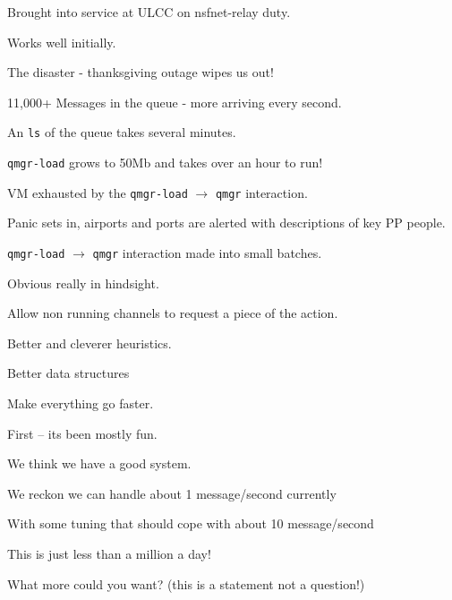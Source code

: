 \begin{bwslide}
\begin{nrtc}
\item	Brought into service at ULCC on nsfnet-relay duty.
\item	Works well initially.
\item	The disaster - thanksgiving outage wipes us out!
\item	11,000+ Messages in the queue - more arriving every second.
\item	An \verb|ls| of the queue takes several minutes.
\item	\verb|qmgr-load| grows to 50Mb and takes over an hour to run!
\item	VM exhausted by the \verb|qmgr-load| $\rightarrow$
	 \verb|qmgr| interaction.
\item	Panic sets in, airports and ports are alerted with
descriptions of key PP people.
\end{nrtc}
\end{bwslide}

\begin{bwslide}
\begin{nrtc}
\item	\verb|qmgr-load| $\rightarrow$ \verb|qmgr| interaction made
	into small batches.
\item	Obvious really in hindsight.
\item	Allow non running channels to request a piece of the action.
\item	Better and cleverer heuristics.
\item	Better data structures
\item	Make everything go faster.
\end{nrtc}
\end{bwslide}

\begin{bwslide}

\begin{nrtc}
\item	First -- its been mostly fun.
\item	We think we have a good system.
\item	We reckon we can handle about 1 message/second currently
\item	With some tuning that should cope with about 10 message/second
\item	This is just less than a million a day!
\item	What more could you want? (this is a statement not a question!)
\end{nrtc}
\end{bwslide}


